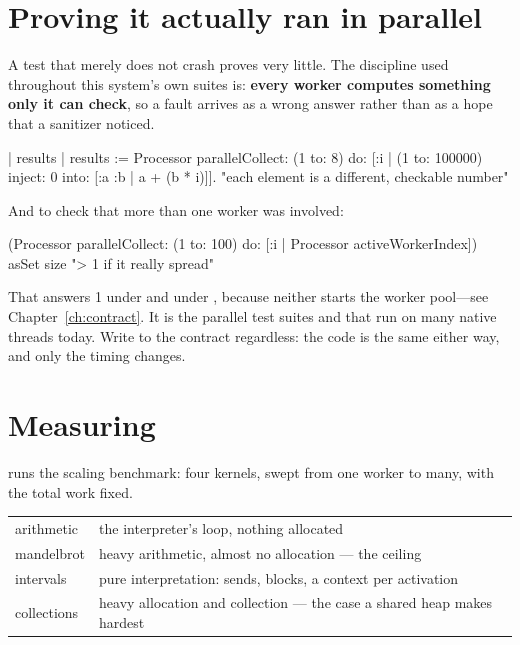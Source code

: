 \section{Proving it actually ran in parallel}

A test that merely does not crash proves very little. The discipline used
throughout this system's own suites is: \textbf{every worker computes something
only it can check}, so a fault arrives as a wrong answer rather than as a hope
that a sanitizer noticed.

\begin{st}
| results |
results := Processor parallelCollect: (1 to: 8) do: [:i |
    (1 to: 100000) inject: 0 into: [:a :b | a + (b * i)]].
"each element is a different, checkable number"
\end{st}

And to check that more than one worker was involved:

\begin{st}
(Processor parallelCollect: (1 to: 100) do: [:i | Processor activeWorkerIndex])
    asSet size                            "> 1 if it really spread"
\end{st}

\begin{stwarn}
That answers 1 under  and under , because
neither starts the worker pool---see Chapter~\ref{ch:contract}. It is the
parallel test suites and  that run on many native threads
today. Write to the contract regardless: the code is the same either way, and
only the timing changes.
\end{stwarn}

\section{Measuring}

 runs the scaling benchmark: four kernels, swept from one
worker to many, with the total work fixed.

\begin{center}
\small
\begin{tabular}{@{}lp{}@{}}
\toprule
arithmetic & the interpreter's loop, nothing allocated\\
mandelbrot & heavy arithmetic, almost no allocation --- the ceiling\\
intervals & pure interpretation: sends, blocks, a context per activation\\
collections & heavy allocation and collection --- the case a shared heap makes
  hardest\\
\bottomrule
\end{tabular}
\end{center}

